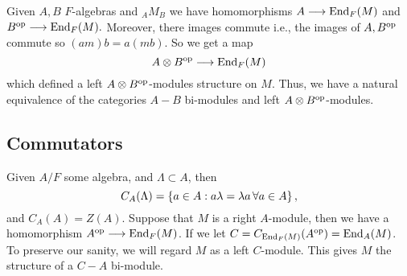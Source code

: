 Given $A,B$ $F$-algebras and ${}_AM_B$ we have homomorphisms $A \longrightarrow \operatorname{End}_F(M)$ and $B^{\operatorname{op}} \longrightarrow \operatorname{End}_F(M).$ Moreover, there images commute i.e., the images of $A,B^{\operatorname{op}}$ commute so $(am)b = a(mb)$. So we get a map 
$$A \otimes B^{\operatorname{op}} \longrightarrow \operatorname{End}_F(M)$$
which defined a left $A\otimes B^{\operatorname{op}}$-modules structure on $M$. Thus, we have a natural equivalence of the categories $A-B$ bi-modules and left $A\otimes B^{\operatorname{op}}$-modules.

\subsection{Commutators}
Given $A/F$ some algebra, and $\Lambda \subset A$, then 
$$C_A(\Lambda) = \left\lbrace a \in A : a \lambda = \lambda a \, \forall a \in A \right\rbrace,$$
and $C_A(A) = Z(A)$. Suppose that $M$ is a right $A$-module, then we have a homomorphism $A^{\operatorname{op}} \longrightarrow \operatorname{End}_F(M)$. If we let $C = C_{\operatorname{End}_F(M)}(A^{\operatorname{op}}) = \operatorname{End}_A(M)$. To preserve our sanity, we will regard $M$ as a left $C$-module. This gives $M$ the structure of a $C-A$ bi-module. 

